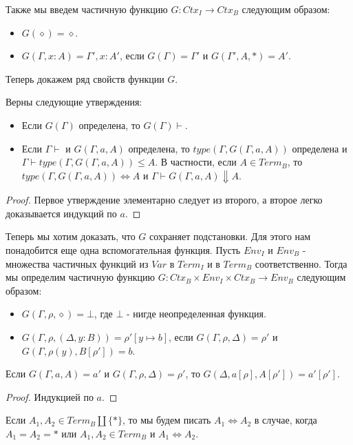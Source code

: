 \documentclass{amsart}
\theoremstyle{definition}
\theoremstyle{remark}
\newcommand{\deq}{\Leftrightarrow}
\numberwithin{figure}{section}
\begin{document}
Также мы введем частичную функцию $G : Ctx_I \to Ctx_B$ следующим образом:
\begin{itemize}
\item $G(\diamond) = \diamond$.
\item $G(\Gamma, x : A) = \Gamma', x : A'$, если $G(\Gamma) = \Gamma'$ и $G(\Gamma', A, *) = A'$.
\end{itemize}

Теперь докажем ряд свойств функции $G$.
\begin{lem}
Верны следующие утверждения:
\begin{itemize}
\item Если $G(\Gamma)$ определена, то $G(\Gamma) \vdash$.
\item Если $\Gamma \vdash$ и $G(\Gamma, a, A)$ определена, то $type(\Gamma, G(\Gamma, a, A))$ определена и $\Gamma \vdash type(\Gamma, G(\Gamma, a, A)) \leq A$.
    В частности, если $A \in Term_B$, то $type(\Gamma, G(\Gamma, a, A)) \deq A$ и $\Gamma \vdash G(\Gamma, a, A) \Downarrow A$.
\end{itemize}
\end{lem}
\begin{proof}
Первое утверждение элементарно следует из второго, а второе легко доказывается индукций по $a$.
\end{proof}

Теперь мы хотим доказать, что $G$ сохраняет подстановки.
Для этого нам понадобится еще одна вспомогательная функция.
Пусть $Env_I$ и $Env_B$ - множества частичных функций из $Var$ в $Term_I$ и в $Term_B$ соответственно.
Тогда мы определим частичную функцию $G : Ctx_B \times Env_I \times Ctx_B \to Env_B$ следующим образом:
\begin{itemize}
\item $G(\Gamma, \rho, \diamond) = \bot$, где $\bot$ - нигде неопределенная функция.
\item $G(\Gamma, \rho, (\Delta, y : B)) = \rho'[y \mapsto b]$, если $G(\Gamma, \rho, \Delta) = \rho'$ и $G(\Gamma, \rho(y), B[\rho']) = b$.
\end{itemize}

\begin{lem}
Если $G(\Gamma, a, A) = a'$ и $G(\Gamma, \rho, \Delta) = \rho'$, то $G(\Delta, a[\rho], A[\rho']) = a'[\rho']$.
\end{lem}
\begin{proof}
Индукцией по $a$.
\end{proof}

Если $A_1, A_2 \in Term_B \amalg \{ * \}$, то мы будем писать $A_1 \deq A_2$ в случае, когда $A_1 = A_2 = *$ или $A_1, A_2 \in Term_B$ и $A_1 \deq A_2$.
\end{document}
